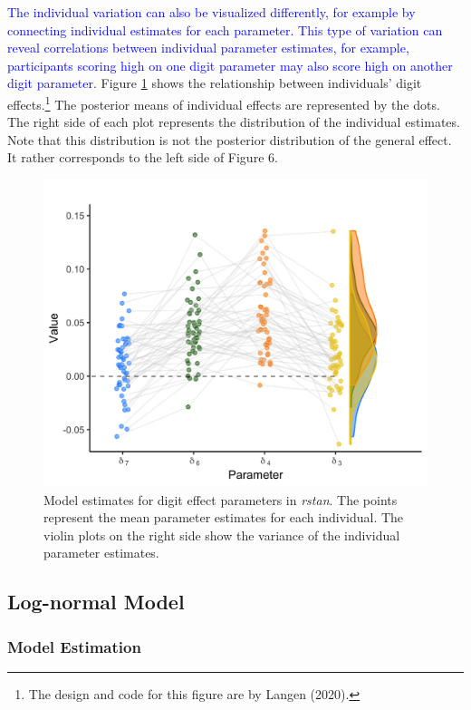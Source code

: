 \documentclass[
  english,
  doc,floatsintext]{apa6}
\begin{document}
\textcolor{blue}{The individual variation can also be visualized differently, for example by connecting individual estimates for each parameter. This type of variation can reveal correlations between individual parameter estimates, for example, participants scoring high on one digit parameter may also score high on another digit parameter.} Figure \ref{fig:modelestimatesfigure3} shows the relationship between individuals' digit effects.\footnote{The design and code for this figure are by Langen (2020).} The posterior means of individual effects are represented by the dots. The right side of each plot represents the distribution of the individual estimates. Note that this distribution is not the posterior distribution of the general effect. It rather corresponds to the left side of Figure 6.

\begin{figure}[H]

\includegraphics[width=0.75\linewidth]{I - Images/Fig12_modelestimatefigure2_onlyrstan_v2} \hfill{}

\caption{Model estimates for digit effect parameters in \textit{rstan}. The points represent the mean parameter estimates for each individual. The violin plots on the right side show the variance of the individual parameter estimates. }\label{fig:modelestimatesfigure3}
\end{figure}

\hypertarget{log-normal-model-2}{%
\subsection{Log-normal Model}\label{log-normal-model-2}}

\hypertarget{model-estimation}{%
\subsubsection{Model Estimation}\label{model-estimation}}
\end{document}

